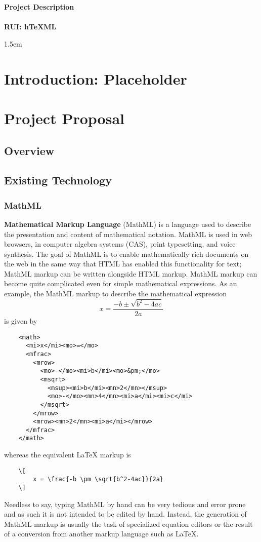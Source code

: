\documentclass[11pt]{article}
\theoremstyle{theorem}
\theoremstyle{definition}
\begin{document}
\begin{center}
\textbf{\Large Project Description}\\[0.25cm]
\hrulefill\\
\textbf{\Large RUI:  hTeXML}\\
\hrulefill
\end{center}
\baselineskip 1.5em

\section{Introduction: Placeholder}


\section{Project Proposal}



\subsection{Overview}

\subsection{Existing Technology}

\subsubsection{MathML}
\textbf{Mathematical Markup Language} (MathML) is a language used to describe the presentation and content of mathematical notation.  MathML is used in web browsers, in computer algebra systems (CAS), print typesetting, and voice synthesis.  The goal of MathML is to enable mathematically rich documents on the web in the same way that HTML has enabled this functionality for text; MathML markup can be written alongside HTML markup.  MathML markup can become quite complicated even for simple mathematical expressions.  As an example, the MathML markup to describe the mathematical expression
\[
x = \frac{-b \pm\sqrt{b^2-4ac}}{2a}
\]
is given by
\begin{verbatim}
    <math>
      <mi>x</mi><mo>=</mo>
      <mfrac>
        <mrow>
          <mo>-</mo><mi>b</mi><mo>&pm;</mo>
          <msqrt>
            <msup><mi>b</mi><mn>2</mn></msup>
            <mo>-</mo><mn>4</mn><mi>a</mi><mi>c</mi>
          </msqrt>
        </mrow>
        <mrow><mn>2</mn><mi>a</mi></mrow>
      </mfrac>
    </math>
\end{verbatim}
whereas the equivalent LaTeX markup is
\begin{verbatim}
    \[
        x = \frac{-b \pm \sqrt{b^2-4ac}}{2a}
    \]
\end{verbatim}
Needless to say, typing MathML by hand can be very tedious and error prone and as such it is not intended to be edited by hand.  Instead, the generation of MathML markup is usually the task of specialized equation editors or the result of a conversion from another markup language such as LaTeX.
 
\end{document}
